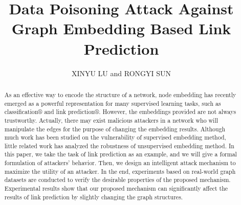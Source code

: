 \documentclass{acmtog} %
\begin{document}

\title{Data Poisoning Attack Against Graph Embedding Based Link
	Prediction} %

\author{XINYU LU {\upshape and} RONGYI SUN
}






\maketitle




\begin{abstract}

As an effective way to encode the structure of a network, node embedding has recently emerged as a powerful representation for many supervised learning tasks, such as classification® and link prediction®. However, the embeddings provided are not always trustworthy. Actually, there may exist malicious attackers in a network who will manipulate the edges for the purpose of changing the embedding results. Although much work has been studied on the vulnerability of supervised embedding method, little related work has analyzed the robustness of unsupervised embedding method. In this paper, we take the task of link prediction as an example, and we will give a formal formulation of attackers' behavior. Then, we design an intelligent attack mechanism to maximize the utility of an attacker. In the end, experiments based on real-world graph datasets are conducted to verify the desirable properties of the proposed mechanism. Experimental results show that our proposed mechanism can significantly affect the results of link prediction by slightly changing the graph structures.


\end{abstract}
\end{document}
